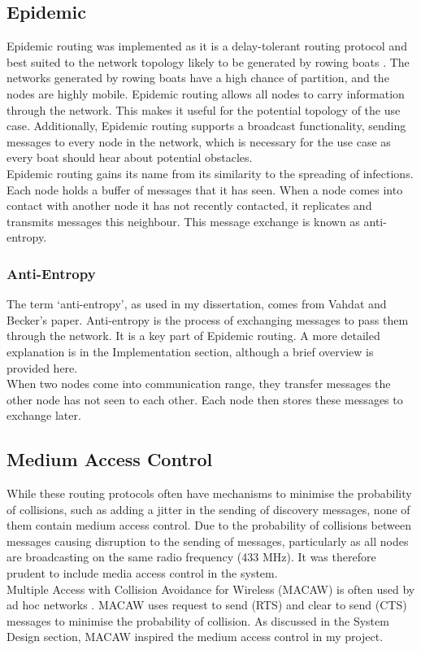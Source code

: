 \documentclass[12pt,a4paper]{report}
\begin{document}
\subsection{Epidemic}
Epidemic routing was implemented as it is a delay-tolerant routing protocol and best suited to the network topology likely to be generated by rowing boats \cite{epidemic}. The networks generated by rowing boats have a high chance of partition, and the nodes are highly mobile. Epidemic routing allows all nodes to carry information through the network. This makes it useful for the potential topology of the use case. Additionally, Epidemic routing supports a broadcast functionality, sending messages to every node in the network, which is necessary for the use case as every boat should hear about potential obstacles. \\
Epidemic routing gains its name from its similarity to the spreading of infections. Each node holds a buffer of messages that it has seen. When a node comes into contact with another node it has not recently contacted, it replicates and transmits messages this neighbour. This message exchange is known as anti-entropy. \\

\subsubsection{Anti-Entropy}
The term `anti-entropy', as used in my dissertation, comes from Vahdat and Becker's paper. Anti-entropy is the process of exchanging messages to pass them through the network. It is a key part of Epidemic routing. A more detailed explanation is in the Implementation section, although a brief overview is provided here. \\
When two nodes come into communication range, they transfer messages the other node has not seen to each other. Each node then stores these messages to exchange later. 

\subsection{Medium Access Control}
While these routing protocols often have mechanisms to minimise the probability of collisions, such as adding a jitter in the sending of discovery messages, none of them contain medium access control. Due to the probability of collisions between messages causing disruption to the sending of messages, particularly as all nodes are broadcasting on the same radio frequency (433 MHz). It was  therefore prudent to include media access control in the system. \\
Multiple Access with Collision Avoidance for Wireless (MACAW) is often used by ad hoc networks \cite{macaw}. MACAW uses request to send (RTS) and clear to send (CTS) messages to minimise the probability of collision. As discussed in the System Design section, MACAW inspired the medium access control in my project. \\
\end{document}
